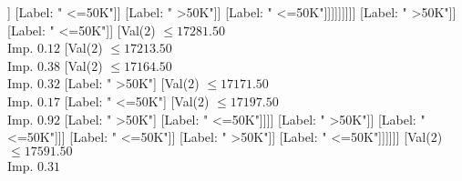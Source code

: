 \documentclass[margin=10pt]{standalone}
\begin{document}
\begin{forest}
																										[Label: " <=50K"]
																										[Val($2$) $ \leq 16559.50$ \\ Imp. $0.08$
																											[Label: " >50K"]
																											[Val($2$) $ \leq 16717.50$ \\ Imp. $0.07$
																												[Label: " <=50K"]
																												[Val($2$) $ \leq 16729.50$ \\ Imp. $0.12$
																													[Label: " >50K"]
																													[Val($2$) $ \leq 16779.50$ \\ Imp. $0.06$
																														[Label: " <=50K"]
																														[Val($2$) $ \leq 16783.50$ \\ Imp. $0.16$
																															[Label: " >50K"]
																															[Val($2$) $ \leq 16912.50$ \\ Imp. $0.07$
																																[Val($2$) $ \leq 16902.50$ \\ Imp. $0.26$
																																	[Val($2$) $ \leq 16879.50$ \\ Imp. $0.11$
																																		[Val($2$) $ \leq 16814.50$ \\ Imp. $0.32$
																																			[Label: " <=50K"]
																																			[Label: " >50K"]]
																																		[Label: " <=50K"]]
																																	[Label: " >50K"]]
																																[Label: " <=50K"]]]]]]]]]
																								[Label: " >50K"]]
																							[Label: " <=50K"]]
																						[Val($2$) $ \leq 17281.50$ \\ Imp. $0.12$
																							[Val($2$) $ \leq 17213.50$ \\ Imp. $0.38$
																								[Val($2$) $ \leq 17164.50$ \\ Imp. $0.32$
																									[Label: " >50K"]
																									[Val($2$) $ \leq 17171.50$ \\ Imp. $0.17$
																										[Label: " <=50K"]
																										[Val($2$) $ \leq 17197.50$ \\ Imp. $0.92$
																											[Label: " >50K"]
																											[Label: " <=50K"]]]]
																								[Label: " >50K"]]
																							[Label: " <=50K"]]]
																					[Label: " <=50K"]]
																				[Label: " >50K"]]
																			[Label: " <=50K"]]]]]]
														[Val($2$) $ \leq 17591.50$ \\ Imp. $0.31$

\end{forest}
\end{document}
